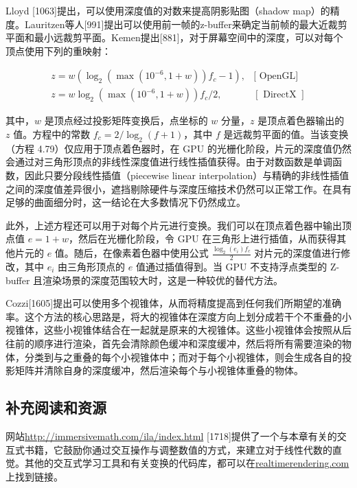 \documentclass[
  paper=a4,
  ,captions=tableheading
]{scrartcl}
\begin{document}
Lloyd {[}1063{]}提出，可以使用深度值的对数来提高阴影贴图（shadow
map）的精度。Lauritzen等人{[}991{]}提出可以使用前一帧的z-buffer来确定当前帧的最大近裁剪平面和最小远裁剪平面。Kemen提出{[}881{]}，对于屏幕空间中的深度，可以对每个顶点使用下列的重映射：

\[
  \begin{array}{ll}z=w\left(\log _{2}\left(\max \left(10^{-6}, 1+w\right)\right) f_{c}-1\right), & {[\text { OpenGL] }} \\ z=w \log _{2}\left(\max \left(10^{-6}, 1+w\right)\right) f_{c} / 2, & {[\text { DirectX }]}\end{array}
  \tag{4.79}
\]

其中，\(w\) 是顶点经过投影矩阵变换后，点坐标的 \(w\) 分量，\(z\) 是顶点着色器输出的 \(z\) 值。方程中的常数 \(f_c = 2 / \log_2(f+1)\)，其中 \(f\) 是远裁剪平面的值。当该变换（方程 4.79）仅应用于顶点着色器时，在 GPU 的光栅化阶段，片元的深度值仍然会通过对三角形顶点的非线性深度值进行线性插值获得。由于对数函数是单调函数，因此只要分段线性插值（piecewise linear interpolation）与精确的非线性插值之间的深度值差异很小，遮挡剔除硬件与深度压缩技术仍然可以正常工作。在具有足够的曲面细分时，这一结论在大多数情况下仍然成立。

此外，上述方程还可以用于对每个片元进行变换。我们可以在顶点着色器中输出顶点值 \(e = 1 + w\)，然后在光栅化阶段，令 GPU 在三角形上进行插值，从而获得其他片元的 \(e\) 值。随后，在像素着色器中使用公式  
\(
\frac{\log_2(e_i) f_c}{2}
\)  
对片元的深度值进行修改，其中 \(e_i\) 由三角形顶点的 \(e\) 值通过插值得到。当 GPU 不支持浮点类型的 Z-buffer 且渲染场景的深度范围较大时，这是一种较优的替代方法。



Cozzi{[}1605{]}提出可以使用多个视锥体，从而将精度提高到任何我们所期望的准确率。这个方法的核心思路是，将大的视锥体在深度方向上划分成若干个不重叠的小视锥体，这些小视锥体结合在一起就是原来的大视锥体。这些小视锥体会按照从后往前的顺序进行渲染，首先会清除颜色缓冲和深度缓冲，然后将所有需要渲染的物体，分类到与之重叠的每个小视锥体中；而对于每个小视锥体，则会生成各自的投影矩阵并清除自身的深度缓冲，然后渲染每个与小视锥体重叠的物体。

\subsection{补充阅读和资源}\label{ux8865ux5145ux9605ux8bfbux548cux8d44ux6e90}

网站\url{http://immersivemath.com/ila/index.html}
{[}1718{]}提供了一个与本章有关的交互式书籍，它鼓励你通过交互操作与调整数值的方式，来建立对于线性代数的直觉。其他的交互式学习工具和有关变换的代码库，都可以在\href{http://realtimerendering.com}{realtimerendering.com}上找到链接。
\end{document}
